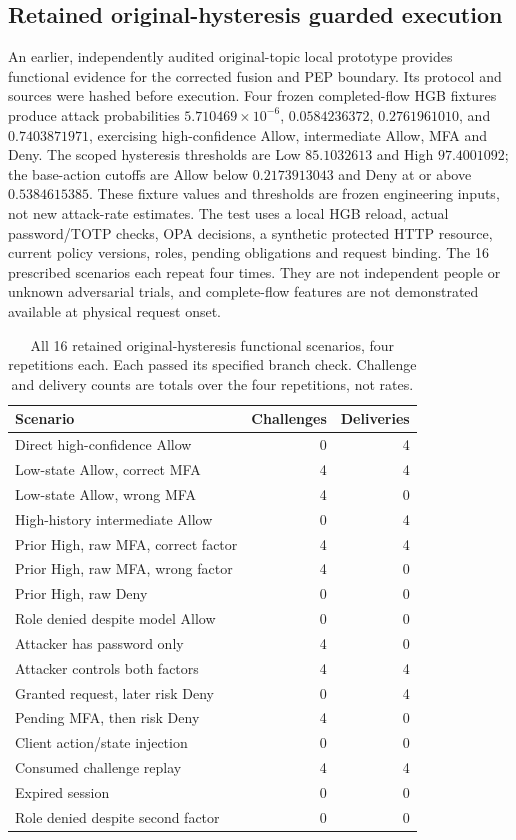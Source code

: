 \subsection{Retained original-hysteresis guarded execution}
\label{sec:supp_guard_execution}
An earlier, independently audited original-topic local
prototype provides functional evidence for the corrected
fusion and PEP boundary. Its protocol and sources were
hashed before execution. Four frozen completed-flow HGB
fixtures produce attack probabilities
\(5.710469\times10^{-6}\), \(0.0584236372\),
\(0.2761961010\), and \(0.7403871971\),
exercising high-confidence Allow, intermediate
Allow, MFA and Deny. The scoped hysteresis
thresholds are Low \(85.1032613\) and High
\(97.4001092\); the base-action cutoffs are
Allow below \(0.2173913043\) and Deny at or above
\(0.5384615385\). These fixture values and
thresholds are frozen engineering inputs, not
new attack-rate estimates. The test uses a
local HGB reload, actual password/TOTP checks,
OPA decisions, a synthetic protected HTTP
resource, current policy versions, roles,
pending obligations and request binding.
The 16 prescribed scenarios each repeat four
times. They are not independent people or
unknown adversarial trials, and complete-flow
features are not demonstrated available at
physical request onset.

\begin{table}[!htbp]
\centering
\caption{All 16 retained original-hysteresis
functional scenarios, four repetitions each.
Each passed its specified branch check.
Challenge and delivery counts are totals
over the four repetitions, not rates.}
\label{tab:supp_execution}
\footnotesize
\begin{tabular}{p{}rr}
\toprule
Scenario & Challenges & Deliveries\\
\midrule
Direct high-confidence Allow & 0 & 4\\
Low-state Allow, correct MFA & 4 & 4\\
Low-state Allow, wrong MFA & 4 & 0\\
High-history intermediate Allow & 0 & 4\\
Prior High, raw MFA, correct factor & 4 & 4\\
Prior High, raw MFA, wrong factor & 4 & 0\\
Prior High, raw Deny & 0 & 0\\
Role denied despite model Allow & 0 & 0\\
Attacker has password only & 4 & 0\\
Attacker controls both factors & 4 & 4\\
Granted request, later risk Deny & 0 & 4\\
Pending MFA, then risk Deny & 4 & 0\\
Client action/state injection & 0 & 0\\
Consumed challenge replay & 4 & 4\\
Expired session & 0 & 0\\
Role denied despite second factor & 0 & 0\\
\bottomrule
\end{tabular}
\end{table}

